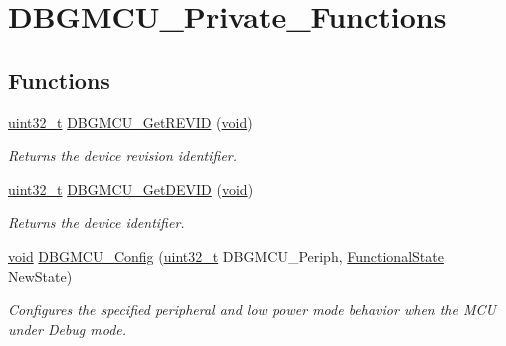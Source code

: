 \hypertarget{group___d_b_g_m_c_u___private___functions}{}\section{D\+B\+G\+M\+C\+U\+\_\+\+Private\+\_\+\+Functions}
\label{group___d_b_g_m_c_u___private___functions}
\subsection*{Functions}
\begin{DoxyCompactItemize}
\item 
\hyperlink{_p_e___types_8h_a33594304e786b158f3fb30289278f5af}{uint32\+\_\+t} \hyperlink{group___d_b_g_m_c_u___private___functions_ga47419e9ca75ab7be4c70feb82faa0511}{D\+B\+G\+M\+C\+U\+\_\+\+Get\+R\+E\+V\+ID} (\hyperlink{usb__devapi_8h_afabf60e7f57651d6d595a02c75f07cd0}{void})
\begin{DoxyCompactList}\small\item\em Returns the device revision identifier. \end{DoxyCompactList}\item 
\hyperlink{_p_e___types_8h_a33594304e786b158f3fb30289278f5af}{uint32\+\_\+t} \hyperlink{group___d_b_g_m_c_u___private___functions_gac34193c34dbce759bf424957a31b3266}{D\+B\+G\+M\+C\+U\+\_\+\+Get\+D\+E\+V\+ID} (\hyperlink{usb__devapi_8h_afabf60e7f57651d6d595a02c75f07cd0}{void})
\begin{DoxyCompactList}\small\item\em Returns the device identifier. \end{DoxyCompactList}\item 
\hyperlink{usb__devapi_8h_afabf60e7f57651d6d595a02c75f07cd0}{void} \hyperlink{group___d_b_g_m_c_u___private___functions_gadf2f267f855ac1e4c03905c5dcfbd28b}{D\+B\+G\+M\+C\+U\+\_\+\+Config} (\hyperlink{_p_e___types_8h_a33594304e786b158f3fb30289278f5af}{uint32\+\_\+t} D\+B\+G\+M\+C\+U\+\_\+\+Periph, \hyperlink{agilefox_2library_2inc_2stm32f10x__type_8h_ac9a7e9a35d2513ec15c3b537aaa4fba1}{Functional\+State} New\+State)
\begin{DoxyCompactList}\small\item\em Configures the specified peripheral and low power mode behavior when the M\+CU under Debug mode. \end{DoxyCompactList}\end{DoxyCompactItemize}


